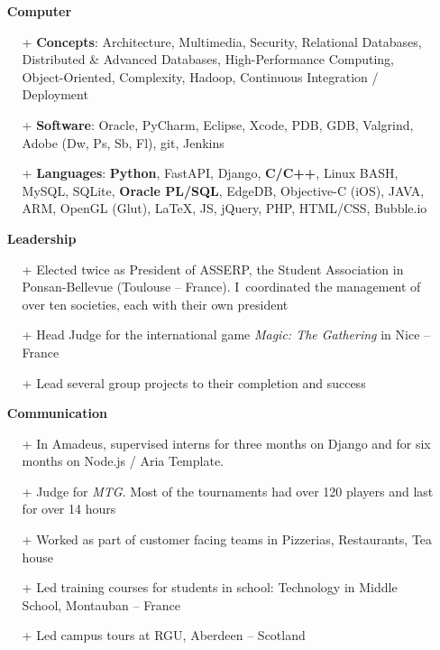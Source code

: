 \documentclass{res}
\begin{document}
\begin{resume}
        \begin{itemize}
        \item[] \faLaptopCode~\textbf{Computer}
                \begin{itemize}
                  \item[+] \textbf{Concepts}: Architecture, Multimedia, Security, Relational Databases, Distributed \& Advanced Databases, High-Performance Computing, Object-Oriented, Complexity, Hadoop, Continuous Integration / Deployment
                  \item[+] \textbf{Software}: Oracle, PyCharm, Eclipse, Xcode, PDB, GDB, Valgrind, Adobe (Dw, Ps, Sb, Fl), git, Jenkins
                  \item[+] \textbf{Languages}: \textbf{Python}, FastAPI, Django, \textbf{C/C++}, Linux BASH, MySQL, SQLite, \textbf{Oracle PL/SQL}, EdgeDB, Objective-C (iOS), JAVA, ARM, OpenGL (Glut), \LaTeX{}, JS, jQuery, PHP, HTML/CSS, Bubble.io
                \end{itemize}
        \end{itemize}

        \begin{itemize}
        \item[] \faHandshake[regular]~\textbf{Leadership}
                \begin{itemize}
                   \item[+] Elected twice as President of ASSERP, the Student Association in Ponsan-Bellevue (Toulouse -- France). I~coordinated the management of over ten societies, each with their own president
                  \item[+] Head Judge for the international game \textit{Magic: The Gathering} in Nice -- France
                  \item[+] Lead several group projects to their completion and success
                \end{itemize}
        \end{itemize}

        \begin{itemize}
        \item[] \faComments[regular]~\textbf{Communication}
            \begin{itemize}
							\item[+] In Amadeus, supervised interns for three months on Django and for six months on Node.js / Aria Template.
                \item[+] Judge for \textit{MTG}. Most of the tournaments had over 120 players and last for over 14 hours
                \item[+] Worked as part of customer facing teams in Pizzerias, Restaurants, Tea house
                \item[+] Led training courses for students in school: Technology in Middle School, Montauban -- France
                \item[+] Led campus tours at RGU, Aberdeen -- Scotland
            \end{itemize}
        \end{itemize}



\end{resume}
\end{document}
